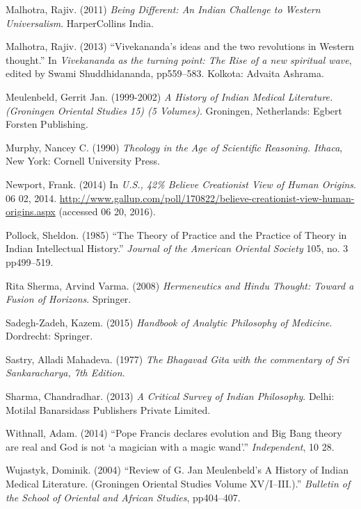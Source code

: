 \begin{thebibliography}{99}
Malhotra, Rajiv. (2011) {\sl Being Different: An Indian Challenge to Western Universalism}. HarperCollins India.

Malhotra, Rajiv. (2013) ``Vivekananda's ideas and the two revolutions in Western thought.'' In {\sl Vivekananda as the turning point: The Rise of a new spiritual wave}, edited by Swami Shuddhidananda, pp559--583. Kolkota: Advaita Ashrama.

Meulenbeld, Gerrit Jan. (1999-2002) {\sl A History of Indian Medical Literature. (Groningen Oriental Studies 15) (5 Volumes)}. Groningen, Netherlands: Egbert Forsten Publishing.

Murphy, Nancey C. (1990) {\sl Theology in the Age of Scientific Reasoning. Ithaca}, New York: Cornell University Press.

Newport, Frank. (2014) In {\sl U.S., 42\% Believe Creationist View of Human Origins}. 06 02, 2014. \url{http://www.gallup.com/poll/170822/believe-creationist-view-human-origins.aspx} (accessed 06 20, 2016).

Pollock, Sheldon. (1985) ``The Theory of Practice and the Practice of Theory in Indian Intellectual History.'' {\sl Journal of the American Oriental Society} 105, no. 3 pp499--519.

Rita Sherma, Arvind Varma. (2008) {\sl Hermeneutics and Hindu Thought: Toward a Fusion of Horizons}. Springer.

Sadegh-Zadeh, Kazem. (2015) {\sl Handbook of Analytic Philosophy of Medicine}. Dordrecht: Springer.

Sastry, Alladi Mahadeva. (1977) {\sl The Bhagavad Gita with the commentary of Sri Sankaracharya, 7th Edition}.

Sharma, Chandradhar. (2013) {\sl A Critical Survey of Indian Philosophy}. Delhi: Motilal Banarsidass Publishers Private Limited.

Withnall, Adam. (2014) ``Pope Francis declares evolution and Big Bang theory are real and God is not `a magician with a magic wand'.'' {\sl Independent}, 10 28.

Wujastyk, Dominik. (2004) ``Review of G. Jan Meulenbeld's A History of Indian Medical Literature. (Groningen Oriental Studies Volume XV/I--III.).'' {\sl Bulletin of the School of Oriental and African Studies}, pp404--407.

\end{thebibliography}

\theendnotes
